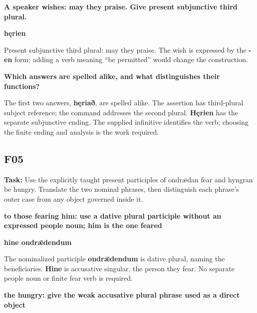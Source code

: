 \textbf{A speaker wishes: may they praise. Give present subjunctive third plural.}

\textbf{hęrien}

Present subjunctive third plural: may they praise. The wish is expressed by the \textbf{-en} form; adding a verb meaning “be permitted” would change the construction.

\textbf{Which answers are spelled alike, and what distinguishes their functions?}

The first two answers, \textbf{hęriað}, are spelled alike. The assertion has third-plural subject reference; the command addresses the second plural. \textbf{Hęrien} has the separate subjunctive ending. The supplied infinitive identifies the verb; choosing the finite ending and analysis is the work required.

\subsection*{F05}

\textbf{Task:} Use the explicitly taught present participles of ondrǣdan fear and hyngran be hungry. Translate the two nominal phrases, then distinguish each phrase's outer case from any object governed inside it.

\textbf{to those fearing him: use a dative plural participle without an expressed people noun; him is the one feared}

\textbf{hine ondrǣdendum}

The nominalized participle \textbf{ondrǣdendum} is dative plural, naming the beneficiaries. \textbf{Hine} is accusative singular, the person they fear. No separate people noun or finite fear verb is required.

\textbf{the hungry: give the weak accusative plural phrase used as a direct object}

